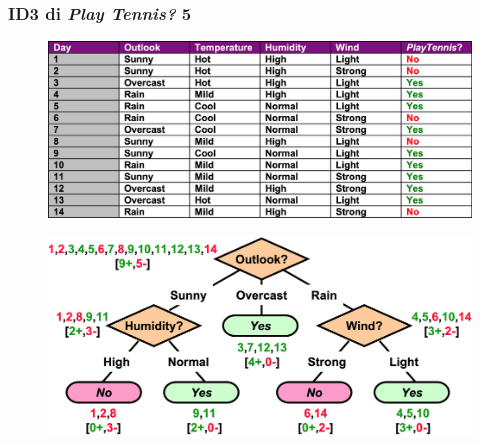 \begin{frame}
	
	\frametitle{ID3 di \textit{Play Tennis?} 5}
	
	\begin{figure}[!htbp]
		\centering
		\includegraphics[width=0.65\linewidth]{images/supervised/decision_trees/example_play_tennis.png}
	\end{figure}
	
	\begin{figure}[!htbp]
		\centering
		\includegraphics[width=0.65\linewidth]{images/supervised/decision_trees/example_id3_completed.png}
	\end{figure}
	
	
\end{frame}


